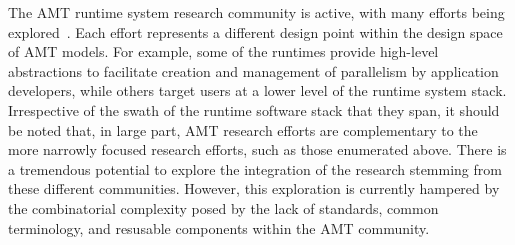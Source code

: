 \begin{figure}
\centering
\caption{}
\label{fig:basicHPCStack}
\end{figure}

The \gls{AMT} \gls{runtime system} research community is active, with many efforts being
explored~\cite{OCR,STAPL,Legion,StencilHPX,Charm++,Uintah, Loci}.
Each effort represents a different design point within the design space of AMT
models. For example, some of the runtimes provide high-level abstractions to
facilitate creation and management of parallelism by application developers,
while others target users at a lower level of the runtime system stack.
Irrespective of the swath of the runtime software stack that they span, it should be
noted that, in large part, \gls{AMT} research efforts are complementary to the 
more narrowly focused research efforts, such as those enumerated above.
There is a tremendous potential to explore the integration of
the research stemming from these different communities.
 However,  this exploration is currently hampered by the combinatorial
 complexity posed by the lack of standards, common terminology, and 
resusable components within the \gls{AMT} community.

